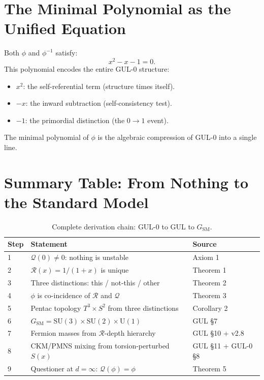 \documentclass[11pt]{article}
\begin{document}
\section{The Minimal Polynomial as the Unified Equation}
\label{app:poly}

Both $\phi$ and $\phi^{-1}$ satisfy:
\begin{equation}
  x^2 - x - 1 = 0.
\end{equation}
This polynomial encodes the entire GUL-0 structure:
\begin{itemize}
  \item $x^2$: the self-referential term (structure times itself).
  \item $-x$: the inward subtraction (self-consistency test).
  \item $-1$: the primordial distinction (the $0\to 1$ event).
\end{itemize}
The minimal polynomial of $\phi$ is the algebraic compression
of GUL-0 into a single line.

\section{Summary Table: From Nothing to the Standard Model}
\label{app:summary}

\begin{table}[htbp]
\centering
\caption{Complete derivation chain: GUL-0 to GUL to $G_{\mathrm{SM}}$.}
\begin{tabular}{@{}lll@{}}
\toprule
Step & Statement & Source \\
\midrule
1 & $\mathcal{Q}(0)\neq 0$: nothing is unstable
  & Axiom 1 \\
2 & $\mathcal{R}(x)=1/(1+x)$ is unique
  & Theorem 1 \\
3 & Three distinctions: this / not-this / other
  & Theorem 2 \\
4 & $\phi$ is co-incidence of $\mathcal{R}$ and $\mathcal{Q}$
  & Theorem 3 \\
5 & Pentac topology $T^3\times S^2$ from three distinctions
  & Corollary 2 \\
6 & $G_{\mathrm{SM}}=\mathrm{SU}(3)\times\mathrm{SU}(2)\times\mathrm{U}(1)$
  & GUL \S7 \\
7 & Fermion masses from $\mathcal{R}$-depth hierarchy
  & GUL \S10 + v2.8 \\
8 & CKM/PMNS mixing from torsion-perturbed $S(x)$
  & GUL \S11 + GUL-0 \S8 \\
9 & Questioner at $d=\infty$: $\mathcal{Q}(\phi)=\phi$
  & Theorem 5 \\
\bottomrule
\end{tabular}
\end{table}
\end{document}
